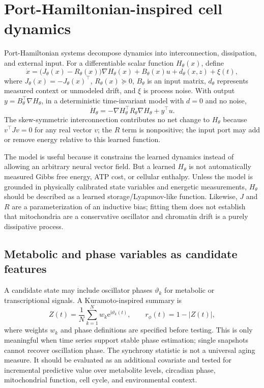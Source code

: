 \documentclass[11pt,a4paper]{article}
\theoremstyle{definition}
\theoremstyle{remark}
\newcommand{\ee}{\mathrm{e}}
\newcommand{\ii}{\mathrm{i}}
\begin{document}
\section{Port-Hamiltonian-inspired cell dynamics}
Port-Hamiltonian systems decompose dynamics into interconnection, dissipation, and external input. For a differentiable scalar function $H_\theta(x)$, define
\begin{equation}
\dot{x}=\big(J_\theta(x)-R_\theta(x)\big)\nabla H_\theta(x)+B_\theta(x)u+d_\theta(x,z)+\xi(t),
\label{eq:ph}
\end{equation}
where $J_\theta(x)=-J_\theta(x)^\top$, $R_\theta(x)\succeq0$, $B_\theta$ is an input matrix, $d_\theta$ represents measured context or unmodeled drift, and $\xi$ is process noise. With output $y=B_\theta^\top\nabla H_\theta$, in a deterministic time-invariant model with $d=0$ and no noise,
\begin{equation}
\dot H_\theta=-\nabla H_\theta^\top R_\theta\nabla H_\theta+y^\top u.
\label{eq:energy_balance}
\end{equation}
The skew-symmetric interconnection contributes no net change to $H_\theta$ because $v^\top Jv=0$ for any real vector $v$; the $R$ term is nonpositive; the input port may add or remove energy relative to this learned function.

The model is useful because it constrains the learned dynamics instead of allowing an arbitrary neural vector field. But a learned $H_\theta$ is not automatically measured Gibbs free energy, ATP cost, or cellular enthalpy. Unless the model is grounded in physically calibrated state variables and energetic measurements, $H_\theta$ should be described as a learned storage/Lyapunov-like function. Likewise, $J$ and $R$ are a parameterization of an inductive bias; fitting them does not establish that mitochondria are a conservative oscillator and chromatin drift is a purely dissipative process.

\subsection{Metabolic and phase variables as candidate features}
A candidate state may include oscillator phases $\vartheta_k$ for metabolic or transcriptional signals. A Kuramoto-inspired summary is
\begin{equation}
Z(t)=\frac{1}{N}\sum_{k=1}^{N}w_k\ee^{\ii\vartheta_k(t)},\qquad r_{\phi}(t)=1-|Z(t)|,
\label{eq:phase_order}
\end{equation}
where weights $w_k$ and phase definitions are specified before testing. This is only meaningful when time series support stable phase estimation; single snapshots cannot recover oscillation phase. The synchrony statistic is not a universal aging measure. It should be evaluated as an additional covariate and tested for incremental predictive value over metabolite levels, circadian phase, mitochondrial function, cell cycle, and environmental context.
\end{document}
